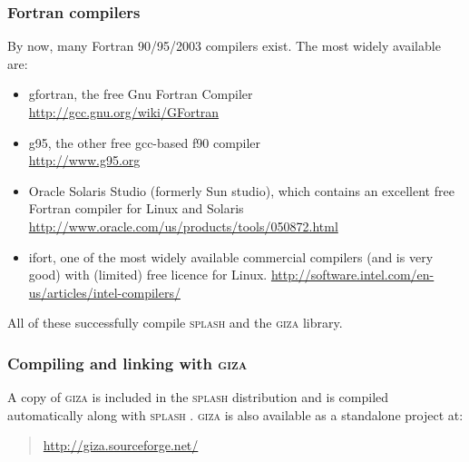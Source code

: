 \documentclass[a4paper,10pt]{article}
\newcommand{\splash}{\textsc{splash }}
\newcommand{\giza}{\textsc{giza }}
\begin{document}
\subsubsection{ Fortran compilers}
 By now, many Fortran 90/95/2003 compilers exist. The most widely available are:
 \begin{itemize}
\item gfortran, the free Gnu Fortran Compiler \\\url{http://gcc.gnu.org/wiki/GFortran}
\item g95, the other free gcc-based f90 compiler\\ \url{http://www.g95.org}
\item Oracle Solaris Studio (formerly Sun studio), which contains an excellent free Fortran compiler for Linux and Solaris \\
\url{http://www.oracle.com/us/products/tools/050872.html}
\item ifort, one of the most widely available commercial compilers (and is very good) with (limited) free licence for Linux.
\url{http://software.intel.com/en-us/articles/intel-compilers/}
\end{itemize}
All of these successfully compile \splash and the \giza library.


\subsubsection{ Compiling and linking with \giza}
A copy of \giza is included in the \splash distribution and is compiled automatically along with \splash. \giza is also available as a standalone project at:
\begin{quote}
\url{http://giza.sourceforge.net/}
\end{quote}
\end{document}
